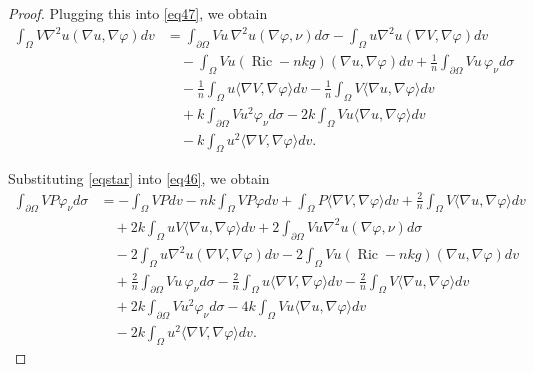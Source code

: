 \documentclass[reqno,11pt]{amsart}
\numberwithin{equation}{section}  %
\begin{document}
\begin{proof}
Plugging this into \eqref{eq47}, we obtain
\begin{align}\label{eqstar}
\int_{\Omega}V\nabla^{2}u(\nabla u,\nabla\varphi)dv
&=
\int_{\partial\Omega}Vu\,\nabla^{2}u(\nabla\varphi,\nu)d\sigma
-
\int_{\Omega}u\nabla^{2}u(\nabla V,\nabla\varphi)dv
\nonumber\\
&\quad
-
\int_{\Omega}Vu(\operatorname{Ric}-nkg)(\nabla u,\nabla\varphi)dv
+
\frac{1}{n}\int_{\partial\Omega}Vu\,\varphi_{\nu}d\sigma
\nonumber\\
&\quad
-
\frac{1}{n}\int_{\Omega}u\langle\nabla V,\nabla\varphi\rangle dv
-
\frac{1}{n}\int_{\Omega}V\langle\nabla u,\nabla\varphi\rangle dv
\nonumber\\
&\quad
+
k\int_{\partial\Omega}Vu^{2}\varphi_{\nu}d\sigma
-
2k\int_{\Omega}Vu\langle\nabla u,\nabla\varphi\rangle dv
\nonumber\\
&\quad
-
k\int_{\Omega}u^{2}\langle\nabla V,\nabla\varphi\rangle dv.
\end{align}

Substituting \eqref{eqstar} into \eqref{eq46}, we obtain
\begin{align}\label{eqtwostar}
\int_{\partial\Omega}VP\varphi_{\nu}d\sigma
&=
-\int_{\Omega}VPdv
-nk\int_{\Omega}VP\varphi dv
+
\int_{\Omega}P\langle\nabla V,\nabla\varphi\rangle dv
+
\frac{2}{n}\int_{\Omega}V\langle\nabla u,\nabla\varphi\rangle dv
\nonumber\\
&\quad
+
2k\int_{\Omega}uV\langle\nabla u,\nabla\varphi\rangle dv
+
2\int_{\partial\Omega}Vu\nabla^{2}u(\nabla\varphi,\nu) d\sigma
\nonumber\\
&\quad
-
2\int_{\Omega}u\nabla^{2}u(\nabla V,\nabla\varphi)dv
-
2\int_{\Omega}Vu(\operatorname{Ric}-nkg)(\nabla u,\nabla\varphi)dv
\nonumber\\
&\quad
+
\frac{2}{n}\int_{\partial\Omega}Vu\,\varphi_{\nu}d\sigma
-
\frac{2}{n}\int_{\Omega}u\langle\nabla V,\nabla\varphi\rangle dv
-
\frac{2}{n}\int_{\Omega}V\langle\nabla u,\nabla\varphi\rangle dv
\nonumber\\
&\quad
+
2k\int_{\partial\Omega}Vu^{2}\varphi_{\nu}d\sigma
-
4k\int_{\Omega}Vu\langle\nabla u,\nabla\varphi\rangle dv
\nonumber\\
&\quad
-
2k\int_{\Omega}u^{2}\langle\nabla V,\nabla\varphi\rangle dv.
\end{align}


\end{proof}
\end{document}
